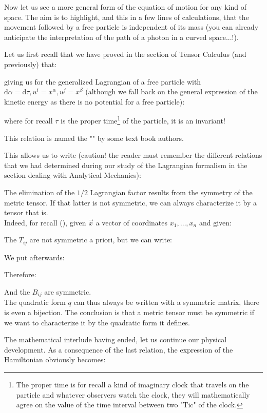 	Now let us see a more general form of the equation of motion for any kind of space. The aim is to highlight, and this in a few lines of calculations, that the movement followed by a free particle is independent of its mass (you can already anticipate the interpretation of the path of a photon in a curved space...!).

	Let us first recall that we have proved in the section of Tensor Calculus (and previously) that:
	
	giving us for the generalized Lagrangian of a free particle with $\mathrm{d}\alpha=\mathrm{d}\tau,u^i=x^\alpha,u^j=x^\beta$ (although we fall back on the general expression of the kinetic energy as there is no potential for a free particle):
	
	where for recall $\tau$ is the proper time\footnote{The proper time is for recall a kind of imaginary clock that travels on the particle and whatever observers watch the clock, they will mathematically agree on the value of the time interval between two "Tic" of the clock.} of the particle, it is an invariant!
	\begin{tcolorbox}[title=Remark,colframe=black,arc=10pt]
	This relation is named the "" by some text book authors.
	\end{tcolorbox}
	This allows us to write (caution! the reader must remember the different relations that we had determined during our study of the Lagrangian formalism in the section dealing with Analytical Mechanics):
	
	\begin{tcolorbox}[title=Remark,colframe=black,arc=10pt]
	The elimination of the $1/2$ Lagrangian factor results from the symmetry of the metric tensor. If that latter is not symmetric, we can always characterize it by a tensor that is.\\

	Indeed, for recall (), given $\vec{x}$ a vector of coordinates $x_1,\ldots,x_n$ and given:
	
	The $T_{ij}$ are not symmetric a priori, but we can write:
	
	We put afterwards:
	
	Therefore:
	
	And the $B_{ij}$ are symmetric.\\
	
	The quadratic form $q$ can thus always be written with a symmetric matrix, there is even a bijection. The conclusion is that a metric tensor must be symmetric if we want to characterize it by the quadratic form it defines.
	\end{tcolorbox}
	The mathematical interlude having ended, let us continue our physical development. As a consequence of the last relation, the expression of the Hamiltonian obviously becomes:
	
